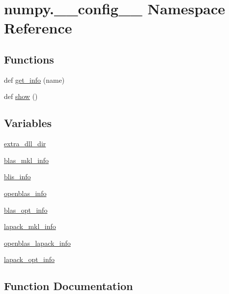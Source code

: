 \hypertarget{namespacenumpy_1_1____config____}{}\section{numpy.\+\_\+\+\_\+config\+\_\+\+\_\+ Namespace Reference}
\label{namespacenumpy_1_1____config____}
\subsection*{Functions}
\begin{DoxyCompactItemize}
\item 
def \hyperlink{namespacenumpy_1_1____config_____a36256e351835b310bd9d0cc91abe20f9}{get\+\_\+info} (name)
\item 
def \hyperlink{namespacenumpy_1_1____config_____a762f8bf342ad98b24ef87a7f64ac3651}{show} ()
\end{DoxyCompactItemize}
\subsection*{Variables}
\begin{DoxyCompactItemize}
\item 
\hyperlink{namespacenumpy_1_1____config_____a550bbf156ac89055b55fbbe9c2630d1a}{extra\+\_\+dll\+\_\+dir}
\item 
\hyperlink{namespacenumpy_1_1____config_____a1a99db757aaa373802a3ae2269dc5f53}{blas\+\_\+mkl\+\_\+info}
\item 
\hyperlink{namespacenumpy_1_1____config_____a4e3811d2e732dca926ba7d29e6297d48}{blis\+\_\+info}
\item 
\hyperlink{namespacenumpy_1_1____config_____a85e19eea82556414e2eab0fab00bb06f}{openblas\+\_\+info}
\item 
\hyperlink{namespacenumpy_1_1____config_____a3ee8a60a6fc457894da4e6d713ded9e8}{blas\+\_\+opt\+\_\+info}
\item 
\hyperlink{namespacenumpy_1_1____config_____a24d118610e893d3ecea9824acf7ccb41}{lapack\+\_\+mkl\+\_\+info}
\item 
\hyperlink{namespacenumpy_1_1____config_____a1b746192d8e89f4e52b2039d270fe6c5}{openblas\+\_\+lapack\+\_\+info}
\item 
\hyperlink{namespacenumpy_1_1____config_____a59c9478b20a0309e3108b9be1d876599}{lapack\+\_\+opt\+\_\+info}
\end{DoxyCompactItemize}


\subsection{Function Documentation}
\mbox{\label{namespacenumpy_1_1____config_____a36256e351835b310bd9d0cc91abe20f9}} 
